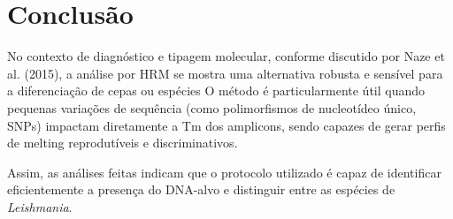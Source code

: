 \section{Conclusão}

No contexto de diagnóstico e tipagem molecular, conforme discutido por Naze et
al. (2015), a análise por HRM se mostra uma alternativa robusta e sensível para
a diferenciação de cepas ou espécies
O método é particularmente útil quando
pequenas variações de sequência (como polimorfismos de nucleotídeo único, SNPs)
impactam diretamente a Tm dos amplicons, sendo capazes de gerar perfis de
melting reprodutíveis e discriminativos.

Assim, as análises feitas indicam que o protocolo utilizado é capaz de
identificar eficientemente a presença do DNA-alvo e distinguir entre as espécies
de \textit{Leishmania}.  

